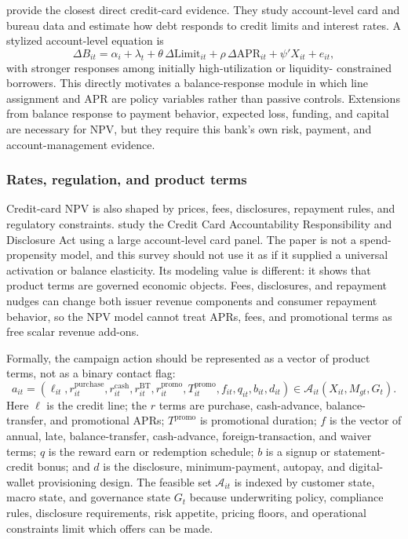 \documentclass[11pt]{article}
\newcommand{\1}{\mathbf{1}}
\begin{document}
\citet{gross2001liquidity} provide the closest direct credit-card evidence.
They study account-level card and bureau data and estimate how debt responds to
credit limits and interest rates. A stylized account-level equation is
\begin{equation}
  \Delta B_{it}
  =
  \alpha_i + \lambda_t
  + \theta\,\Delta \mathrm{Limit}_{it}
  + \rho\,\Delta \mathrm{APR}_{it}
  + \psi' X_{it}
  + e_{it},
  \label{eq:limit-apr-response}
\end{equation}
with stronger responses among initially high-utilization or liquidity-
constrained borrowers. This directly motivates a balance-response module in
which line assignment and APR are policy variables rather than passive
controls. Extensions from balance response to payment behavior, expected loss,
funding, and capital are necessary for NPV, but they require this bank's own
risk, payment, and account-management evidence.

\subsubsection{Rates, regulation, and product terms}

Credit-card NPV is also shaped by prices, fees, disclosures, repayment rules,
and regulatory constraints. \citet{agarwal2013cardact} study the Credit Card
Accountability Responsibility and Disclosure Act using a large account-level
card panel. The paper is not a spend-propensity model, and this survey should
not use it as if it supplied a universal activation or balance elasticity. Its
modeling value is different: it shows that product terms are governed economic
objects. Fees, disclosures, and repayment nudges can change both issuer revenue
components and consumer repayment behavior, so the NPV model cannot treat APRs,
fees, and promotional terms as free scalar revenue add-ons.

Formally, the campaign action should be represented as a vector of product
terms, not as a binary contact flag:
\begin{equation}
  a_{it}
  =
  \left(
    \ell_{it}, r^{\mathrm{purchase}}_{it},
    r^{\mathrm{cash}}_{it}, r^{\mathrm{BT}}_{it},
    r^{\mathrm{promo}}_{it}, T^{\mathrm{promo}}_{it},
    f_{it}, q_{it}, b_{it}, d_{it}
  \right)
  \in \mathcal{A}_{it}(X_{it},M_{gt},G_t).
  \label{eq:offer-vector}
\end{equation}
Here $\ell$ is the credit line; the $r$ terms are purchase, cash-advance,
balance-transfer, and promotional APRs; $T^{\mathrm{promo}}$ is promotional
duration; $f$ is the vector of annual, late, balance-transfer, cash-advance,
foreign-transaction, and waiver terms; $q$ is the reward earn or redemption
schedule; $b$ is a signup or statement-credit bonus; and $d$ is the disclosure,
minimum-payment, autopay, and digital-wallet provisioning design. The feasible
set $\mathcal{A}_{it}$ is indexed by customer state, macro state, and governance
state $G_t$ because underwriting policy, compliance rules, disclosure
requirements, risk appetite, pricing floors, and operational constraints limit
which offers can be made.
\end{document}
